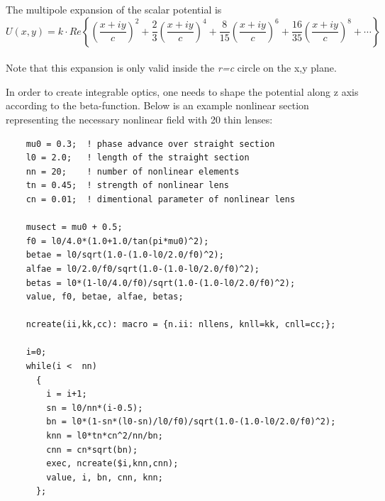 The multipole expansion of the scalar potential is \\
\begin{equation}
U(x,y)=k\cdot Re\left\{ \left(\dfrac{x + i y}{c}\right)^2 +
\frac{2}{3}\left(\dfrac{x + i y}{c}\right)^4 +
\frac{8}{15}\left(\dfrac{x + i y}{c}\right)^6 +
\frac{16}{35}\left(\dfrac{x + i y}{c}\right)^8 + \cdots \right\}
\end{equation}
\\
Note that this expansion is only valid inside the \textit{r=c} circle on
the x,y plane.

In order to create integrable optics, one needs to shape the potential
along z axis according to the beta-function. Below is an example
nonlinear section representing the necessary nonlinear field with 20
thin lenses:
\begin{verbatim}
    mu0 = 0.3;  ! phase advance over straight section
    l0 = 2.0;   ! length of the straight section
    nn = 20;    ! number of nonlinear elements
    tn = 0.45;  ! strength of nonlinear lens
    cn = 0.01;  ! dimentional parameter of nonlinear lens

    musect = mu0 + 0.5;
    f0 = l0/4.0*(1.0+1.0/tan(pi*mu0)^2);
    betae = l0/sqrt(1.0-(1.0-l0/2.0/f0)^2);
    alfae = l0/2.0/f0/sqrt(1.0-(1.0-l0/2.0/f0)^2);
    betas = l0*(1-l0/4.0/f0)/sqrt(1.0-(1.0-l0/2.0/f0)^2);
    value, f0, betae, alfae, betas;

    ncreate(ii,kk,cc): macro = {n.ii: nllens, knll=kk, cnll=cc;};

    i=0;
    while(i <  nn)
      {
        i = i+1;
        sn = l0/nn*(i-0.5);
        bn = l0*(1-sn*(l0-sn)/l0/f0)/sqrt(1.0-(1.0-l0/2.0/f0)^2);
        knn = l0*tn*cn^2/nn/bn;
        cnn = cn*sqrt(bn);
        exec, ncreate($i,knn,cnn);
        value, i, bn, cnn, knn;
      };
\end{verbatim}







